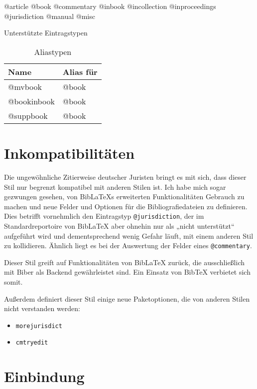 \documentclass[11pt,a4paper,DIV=calc]{scrartcl}
\newcommand\software[1]{\textsf{#1}}
\newcommand\Biblatex{\software{Bib\LaTeX{}}\xspace}
\begin{document}
\begin{table}
  \centering

  @article @book @commentary @inbook @incollection @inproceedings @jurisdiction @manual @misc

  \caption{Unterstützte Eintragstypen}
  \label{tab:unterstuetzte-typen}
\end{table}

\begin{table}
  \centering
  \begin{tabular}{ll}
    \textbf{Name} & \textbf{Alias für}\\
    \hline
    @mvbook         & @book\\
    @bookinbook     & @book\\
    @suppbook       & @book
  \end{tabular}
  \caption{Aliastypen}
  \label{tab:aliastypen}
\end{table}

\section{Inkompatibilitäten}\label{sec:inkompat}

Die ungewöhnliche Zitierweise deutscher Juristen bringt es mit sich,
dass dieser Stil nur begrenzt kompatibel mit anderen Stilen ist. Ich
habe mich sogar gezwungen gesehen, von \Biblatex{}s erweiterten
Funktionalitäten Gebrauch zu machen und neue Felder und Optionen für
die Bibliografiedateien zu definieren. Dies betrifft vornehmlich den
Eintragstyp \verb+@jurisdiction+, der im Standardreportoire von
\Biblatex aber ohnehin nur als „nicht unterstützt“ aufgeführt wird und
dementsprechend wenig Gefahr läuft, mit einem anderen Stil zu
kollidieren. Ähnlich liegt es bei der Auswertung der Felder eines
\verb+@commentary+.

Dieser Stil greift auf Funktionalitäten von \Biblatex zurück, die
ausschließlich mit \software{Biber} als Backend gewährleistet
sind. Ein Einsatz von \software{Bib\TeX{}} verbietet sich somit.

Außerdem definiert dieser Stil einige neue Paketoptionen, die von
anderen Stilen nicht verstanden werden:

\begin{itemize}
\item \verb+morejurisdict+
\item \verb+cmtryedit+
\end{itemize}

\section{Einbindung}
\end{document}
